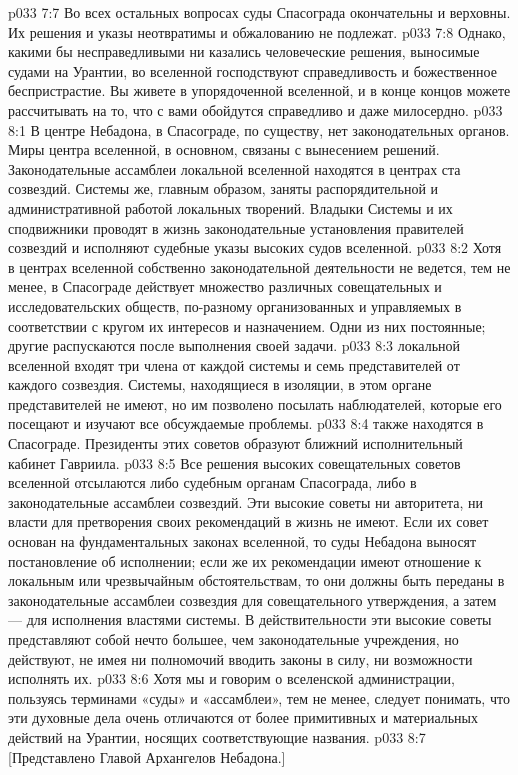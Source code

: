 \vs p033 7:7 \pc Во всех остальных вопросах суды Спасограда окончательны и верховны. Их решения и указы неотвратимы и обжалованию не подлежат.
\vs p033 7:8 Однако, какими бы несправедливыми ни казались человеческие решения, выносимые судами на Урантии, во вселенной господствуют справедливость и божественное беспристрастие. Вы живете в упорядоченной вселенной, и в конце концов можете рассчитывать на то, что с вами обойдутся справедливо и даже милосердно.
\vs p033 8:1 В центре Небадона, в Спасограде, по существу, нет законодательных органов. Миры центра вселенной, в основном, связаны с вынесением решений. Законодательные ассамблеи локальной вселенной находятся в центрах ста созвездий. Системы же, главным образом, заняты распорядительной и административной работой локальных творений. Владыки Системы и их сподвижники проводят в жизнь законодательные установления правителей созвездий и исполняют судебные указы высоких судов вселенной.
\vs p033 8:2 Хотя в центрах вселенной собственно законодательной деятельности не ведется, тем не менее, в Спасограде действует множество различных совещательных и исследовательских обществ, по\hyp{}разному организованных и управляемых в соответствии с кругом их интересов и назначением. Одни из них постоянные; другие распускаются после выполнения своей задачи.
\vs p033 8:3 \pc {} локальной вселенной входят три члена от каждой системы и семь представителей от каждого созвездия. Системы, находящиеся в изоляции, в этом органе представителей не имеют, но им позволено посылать наблюдателей, которые его посещают и изучают все обсуждаемые проблемы.
\vs p033 8:4 \pc {} также находятся в Спасограде. Президенты этих советов образуют ближний исполнительный кабинет Гавриила.
\vs p033 8:5 \pc Все решения высоких совещательных советов вселенной отсылаются либо судебным органам Спасограда, либо в законодательные ассамблеи созвездий. Эти высокие советы ни авторитета, ни власти для претворения своих рекомендаций в жизнь не имеют. Если их совет основан на фундаментальных законах вселенной, то суды Небадона выносят постановление об исполнении; если же их рекомендации имеют отношение к локальным или чрезвычайным обстоятельствам, то они должны быть переданы в законодательные ассамблеи созвездия для совещательного утверждения, а затем --- для исполнения властями системы. В действительности эти высокие советы представляют собой нечто большее, чем законодательные учреждения, но действуют, не имея ни полномочий вводить законы в силу, ни возможности исполнять их.
\vs p033 8:6 Хотя мы и говорим о вселенской администрации, пользуясь терминами «суды» и «ассамблеи», тем не менее, следует понимать, что эти духовные дела очень отличаются от более примитивных и материальных действий на Урантии, носящих соответствующие названия.
\vsetoff
\vs p033 8:7 [Представлено Главой Архангелов Небадона.]
